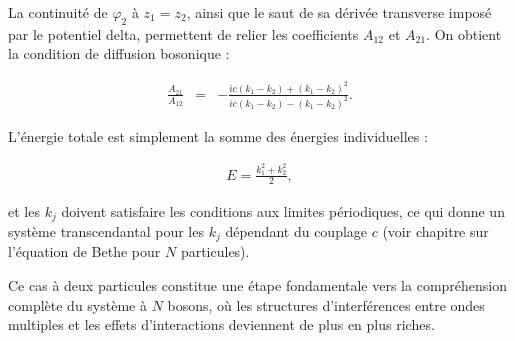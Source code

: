 La continuité de \(\varphi_2\) à \(z_1 = z_2\), ainsi que le saut de sa dérivée transverse imposé par le potentiel delta, permettent de relier les coefficients \(A_{12}\) et \(A_{21}\). On obtient la condition de diffusion bosonique :

\begin{eqnarray}
	\frac{A_{21}}{A_{12}} & = & - \frac{ic(k_1 - k_2) + (k_1 - k_2)^2}{ic(k_1 - k_2) - (k_1 - k_2)^2}.
\end{eqnarray}

L’énergie totale est simplement la somme des énergies individuelles :

\begin{eqnarray}
	E = \frac{k_1^2 + k_2^2}{2},
\end{eqnarray}

et les \(k_j\) doivent satisfaire les conditions aux limites périodiques, ce qui donne un système transcendantal pour les \(k_j\) dépendant du couplage \(c\) (voir chapitre sur l'équation de Bethe pour \(N\) particules).

\vspace{1em}
Ce cas à deux particules constitue une étape fondamentale vers la compréhension complète du système à \(N\) bosons, où les structures d’interférences entre ondes multiples et les effets d’interactions deviennent de plus en plus riches.
